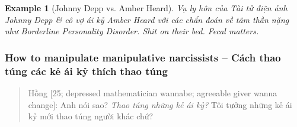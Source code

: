 \documentclass[12pt,oneside]{book}
\newtheorem{example}{Example}
\begin{document}
\begin{example}[{\sc Johnny Depp} vs. Amber Heard]
	Vụ ly hôn của Tài tử điện ảnh {\sc Johnny Depp} \& cô vợ ái kỷ Amber Heard với các chẩn đoán về tâm thần nặng như Borderline Personality Disorder. Shit on their bed. Fecal matters.
\end{example}

\subsubsection{How to manipulate manipulative narcissists -- Cách thao túng các kẻ ái kỷ thích thao túng}

\begin{quote}
	{\sf Hồng [25; depressed mathematician wannabe; agreeable giver wanna change]}: Anh nói sao? {\it Thao túng những kẻ ái kỷ?} Tôi tưởng những kẻ ái kỷ mới thao túng người khác chứ?
	

\end{quote}
\end{document}
